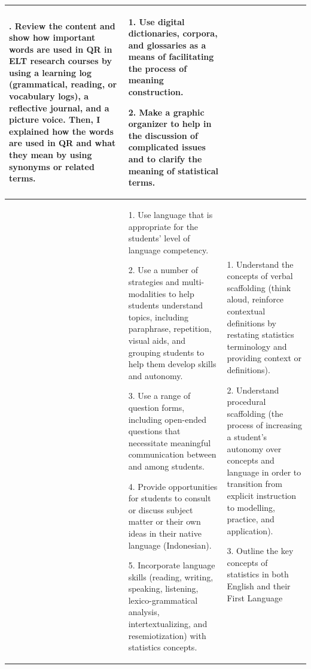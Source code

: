 \documentclass[english]{textolivre}
\begin{document}
\begin{small}
\begin{longtable}{
    >{\raggedright\arraybackslash}p{}
    p{}
    p{}
    }
2. Review the content and show how important words are used in QR in ELT research courses by using a learning log (grammatical, reading, or vocabulary logs), a reflective journal, and a picture voice. Then, I explained how the words are used in QR and what they mean by using synonyms or related terms. 

&     

1. Use digital dictionaries, corpora, and glossaries as a means of facilitating the process of meaning construction.
    
2. Make a graphic organizer to help in the discussion of complicated issues and to clarify the meaning of statistical terms.\\
\midrule
\parbox[t]{2.5mm}{}

&     

1. Use language that is appropriate for the students' level of language competency.
    
2. Use a number of strategies and multi-modalities to help students understand topics, including paraphrase, repetition, visual aids, and grouping students to help them develop skills and autonomy.
    
3. Use a range of question forms, including open-ended questions that necessitate meaningful communication between and among students.
    
4. Provide opportunities for students to consult or discuss subject matter or their own ideas in their native language (Indonesian).

5. Incorporate language skills (reading, writing, speaking, listening, lexico-grammatical analysis, intertextualizing, and resemiotization) with statistics concepts. 

&

1. Understand the concepts of verbal scaffolding (think aloud, reinforce contextual definitions by restating statistics terminology and providing context or definitions).

2.  Understand procedural scaffolding (the process of increasing a student's autonomy over concepts and language in order to transition from explicit instruction to modelling, practice, and application).
    
3. Outline the key concepts of statistics in both English and their First Language \\

\midrule


\end{longtable}
\end{small}
\end{document}
